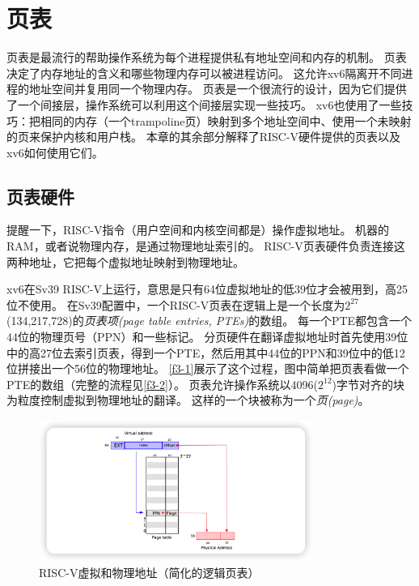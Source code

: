 \chapter{页表}\label{ch03}

页表是最流行的帮助操作系统为每个进程提供私有地址空间和内存的机制。
页表决定了内存地址的含义和哪些物理内存可以被进程访问。
这允许xv6隔离开不同进程的地址空间并复用同一个物理内存。
页表是一个很流行的设计，因为它们提供了一个间接层，操作系统可以利用这个间接层实现一些技巧。
xv6也使用了一些技巧：把相同的内存（一个trampoline页）映射到多个地址空间中、使用一个未映射的页来保护内核和用户栈。
本章的其余部分解释了RISC-V硬件提供的页表以及xv6如何使用它们。

\section{页表硬件}
提醒一下，RISC-V指令（用户空间和内核空间都是）操作虚拟地址。
机器的RAM，或者说物理内存，是通过物理地址索引的。
RISC-V页表硬件负责连接这两种地址，它把每个虚拟地址映射到物理地址。

xv6在Sv39 RISC-V上运行，意思是只有64位虚拟地址的低39位才会被用到，高25位不使用。
在Sv39配置中，一个RISC-V页表在逻辑上是一个长度为$2^{27}$(134,217,728)的\emph{页表项(page table entries, PTEs)}的数组。
每一个PTE都包含一个44位的物理页号（PPN）和一些标记。
分页硬件在翻译虚拟地址时首先使用39位中的高27位去索引页表，得到一个PTE，然后用其中44位的PPN和39位中的低12位拼接出一个56位的物理地址。
\autoref{f3-1}展示了这个过程，图中简单把页表看做一个PTE的数组（完整的流程见\autoref{f3-2}）。
页表允许操作系统以4096($2^{12}$)字节对齐的块为粒度控制虚拟到物理地址的翻译。
这样的一个块被称为一个\emph{页(page)}。

\begin{figure}[htbp]
    \centering
    \includegraphics[width=0.8\textwidth]{../imgs/f3-1.png}
    \caption{RISC-V虚拟和物理地址（简化的逻辑页表）}
    \label{f3-1}
\end{figure}


